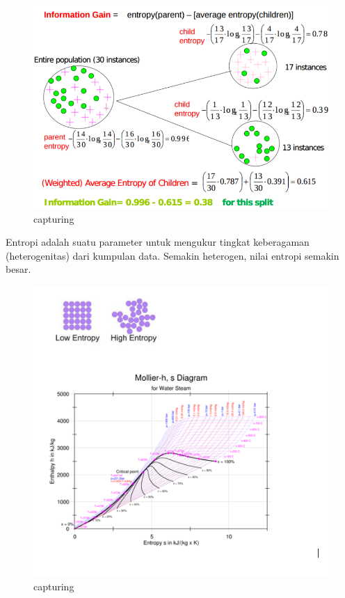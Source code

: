 \begin{enumerate}
\begin{itemize}
\begin{figure}[ht]
\centering
\includegraphics[scale=0.5]{figures/Chapter2-AnnisaFathoroni7.png}
\caption{capturing}
\label{contoh}
\end{figure}

Entropi adalah suatu parameter untuk mengukur tingkat keberagaman (heterogenitas) dari kumpulan data. Semakin heterogen, nilai entropi semakin besar. 
\begin{figure}[ht]
\centering
\includegraphics[scale=0.5]{figures/Chapter2-AnnisaFathoroni8.png}
\caption{capturing}
\label{contoh}
\end{figure}

\end{itemize}
\end{enumerate}

